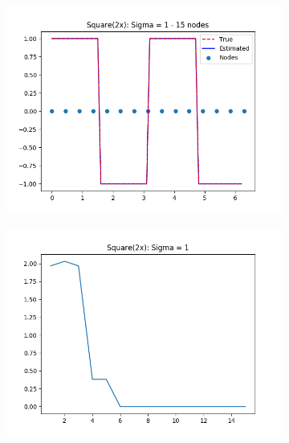 \documentclass{article}
\begin{document}
\begin{figure}[ht!]
    \centering
    \begin{subfigure}[t]{0.4\textwidth}
        \centering
        \includegraphics[width=1\textwidth]{plots/batch/best_square_cheat.png}
        \caption{}
    \end{subfigure}
    \begin{subfigure}[t]{0.4\textwidth}
        \centering
        \includegraphics[width=1\textwidth]{plots/batch/square_error_sign}
        \caption{}
    \end{subfigure}
  \end{figure}
\end{document}
